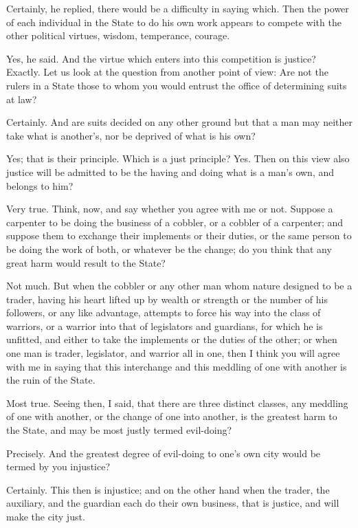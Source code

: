 Certainly, he replied, there would be a difficulty in saying which.
Then the power of each individual in the State to do his own work appears to compete with the other political virtues, wisdom, temperance, courage.

Yes, he said.
And the virtue which enters into this competition is justice?
Exactly.
Let us look at the question from another point of view: Are not the rulers in a State those to whom you would entrust the office of determining suits at law?

Certainly.
And are suits decided on any other ground but that a man may neither take what is another's, nor be deprived of what is his own?

Yes; that is their principle.
Which is a just principle?
Yes.
Then on this view also justice will be admitted to be the having and doing what is a man's own, and belongs to him?

Very true.
Think, now, and say whether you agree with me or not. Suppose a carpenter to be doing the business of a cobbler, or a cobbler of a carpenter; and suppose them to exchange their implements or their duties, or the same person to be doing the work of both, or whatever be the change; do you think that any great harm would result to the State?

Not much.
But when the cobbler or any other man whom nature designed to be a trader, having his heart lifted up by wealth or strength or the number of his followers, or any like advantage, attempts to force his way into the class of warriors, or a warrior into that of legislators and guardians, for which he is unfitted, and either to take the implements or the duties of the other; or when one man is trader, legislator, and warrior all in one, then I think you will agree with me in saying that this interchange and this meddling of one with another is the ruin of the State.

Most true.
Seeing then, I said, that there are three distinct classes, any meddling of one with another, or the change of one into another, is the greatest harm to the State, and may be most justly termed evil-doing?

Precisely.
And the greatest degree of evil-doing to one's own city would be termed by you injustice?

Certainly.
This then is injustice; and on the other hand when the trader, the auxiliary, and the guardian each do their own business, that is justice, and will make the city just.

